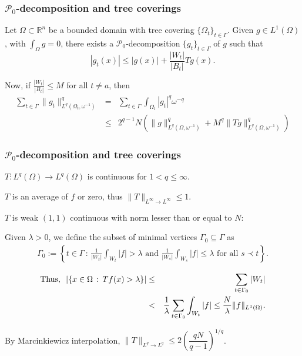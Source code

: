 \documentclass[small,xcolor=svgnames]{beamer}
\def\o{\omega}
\def\O{\Omega}
\def\R{{\mathbb R}}
\def\P{\mathcal{P}}
\def\c{\color{blue}}
\begin{document}

\begin{frame}\frametitle{$\P_0$-decomposition and tree coverings}




\begin{theorem}[L'15] Let $\O\subset\R^n$ be a bounded domain with tree covering $\{\Omega_t\}_{t\in\Gamma}$. Given $g\in L^1(\Omega)$, with $\int_\O g=0$, there exists a  $\P_0$-decomposition $\{g_t\}_{t\in\Gamma}$ of $g$ such that 
\[|g_t(x)| \leq |g(x)|+\frac{|W_t|}{|B_t|}Tg(x).\]
\end{theorem}

Now, if $\frac{|W_t|}{|B_t|}\leq M$ for all $t\neq a$, then 
\begin{eqnarray*}
\sum_{t\in \Gamma} \|g_t\|^q_{L^q(\O_t,\o^{-1})}&=&\sum_{t\in \Gamma} \int_{\O_t}|g_t|^q \o^{-q}\\
&\leq& 2^{q-1}N\left(\|g\|^q_{L^q(\O,\o^{-1})}+M^q\|Tg\|^q_{L^q(\O,\o^{-1})}\right)
\end{eqnarray*}


\end{frame}


\begin{frame}\frametitle{$\P_0$-decomposition and tree coverings}
\begin{lemma}['15]
$T:L^q(\O)\to L^q(\O)$ is continuous for $1<q\leq \infty$.
\end{lemma}
{\c {Proof:}} 
$T$ is an average of $f$ or zero, thus $\|T\|_{L^\infty\to L^\infty} \leq 1$. 
 \bigskip

$T$ is weak $(1,1)$ continuous with norm lesser than or equal to $N$: 

Given $\lambda>0$, we define the subset of minimal vertices $\Gamma_0\subseteq \Gamma$ as 
\begin{eqnarray*}
\Gamma_0:=\left\{t\in \Gamma\,:\,\frac{1}{|W_t|}\int_{W_t}|f|>\lambda\text{ and }\frac{1}{|W_s|}\int_{W_s}|f|\leq\lambda\text{ for all }s\prec t \right\}.
\end{eqnarray*}

\begin{eqnarray*}
{\rm Thus,}\ \ |\{x\in\O\,:\,Tf(x)>\lambda\}|&\leq& \sum_{t\in \Gamma_0}|W_{t}|\\
&<& \frac{1}{\lambda} \sum_{t\in\Gamma_0}\int_{W_{t}}|f|\leq \dfrac{N}{\lambda} \|f\|_{L^1(\O)}.
\end{eqnarray*}



By Marcinkiewicz interpolation, $\|T\|_{L^q\to L^q} \leq 2\left(\dfrac{qN}{q-1}\right)^{1/q}$.

\vspace{.8cm}
\end{frame}
\end{document}
